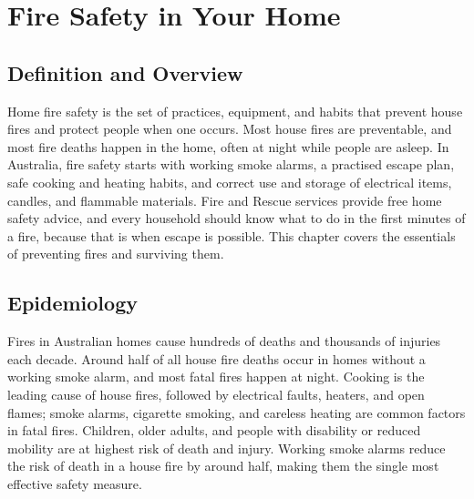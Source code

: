 \chapter{Fire Safety in Your Home}

\section*{Definition and Overview}
Home fire safety is the set of practices, equipment, and habits that prevent house fires and protect people when one occurs. Most house fires are preventable, and most fire deaths happen in the home, often at night while people are asleep. In Australia, fire safety starts with working smoke alarms, a practised escape plan, safe cooking and heating habits, and correct use and storage of electrical items, candles, and flammable materials. Fire and Rescue services provide free home safety advice, and every household should know what to do in the first minutes of a fire, because that is when escape is possible. This chapter covers the essentials of preventing fires and surviving them.

\section*{Epidemiology}
Fires in Australian homes cause hundreds of deaths and thousands of injuries each decade. Around half of all house fire deaths occur in homes without a working smoke alarm, and most fatal fires happen at night. Cooking is the leading cause of house fires, followed by electrical faults, heaters, and open flames; smoke alarms, cigarette smoking, and careless heating are common factors in fatal fires. Children, older adults, and people with disability or reduced mobility are at highest risk of death and injury. Working smoke alarms reduce the risk of death in a house fire by around half, making them the single most effective safety measure.

